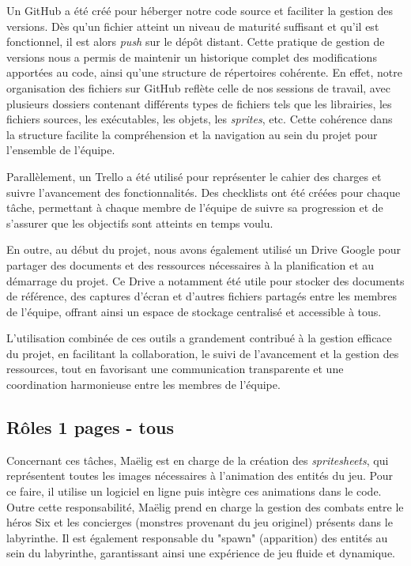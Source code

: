 \documentclass[10pt]{article}
\begin{document}
Un GitHub a été créé pour héberger notre code source et faciliter la gestion des versions. Dès qu'un fichier atteint un niveau de maturité suffisant et qu'il est fonctionnel, il est alors \textit{push} sur le dépôt distant. Cette pratique de gestion de versions nous a permis de maintenir un historique complet des modifications apportées au code, ainsi qu'une structure de répertoires cohérente. En effet, notre organisation des fichiers sur GitHub reflète celle de nos sessions de travail, avec plusieurs dossiers contenant différents types de fichiers tels que les librairies, les fichiers sources, les exécutables, les objets, les \textit{sprites}, etc. Cette cohérence dans la structure facilite la compréhension et la navigation au sein du projet pour l'ensemble de l'équipe.

Parallèlement, un Trello a été utilisé pour représenter le cahier des charges et suivre l'avancement des fonctionnalités. Des checklists ont été créées pour chaque tâche, permettant à chaque membre de l'équipe de suivre sa progression et de s'assurer que les objectifs sont atteints en temps voulu.

En outre, au début du projet, nous avons également utilisé un Drive Google pour partager des documents et des ressources nécessaires à la planification et au démarrage du projet. Ce Drive a notamment été utile pour stocker des documents de référence, des captures d'écran et d'autres fichiers partagés entre les membres de l'équipe, offrant ainsi un espace de stockage centralisé et accessible à tous.

L'utilisation combinée de ces outils a grandement contribué à la gestion efficace du projet, en facilitant la collaboration, le suivi de l'avancement et la gestion des ressources, tout en favorisant une communication transparente et une coordination harmonieuse entre les membres de l'équipe.

\subsection{Rôles 1 pages - tous}
Concernant ces tâches, Maëlig est en charge de la création des \textit{spritesheets}, qui représentent toutes les images nécessaires à l'animation des entités du jeu. Pour ce faire, il utilise un logiciel en ligne puis intègre ces animations dans le code. Outre cette responsabilité, Maëlig prend en charge la gestion des combats entre le héros Six et les concierges (monstres provenant du jeu originel) présents dans le labyrinthe. Il est également responsable du "spawn" (apparition) des entités au sein du labyrinthe, garantissant ainsi une expérience de jeu fluide et dynamique.
\end{document}
